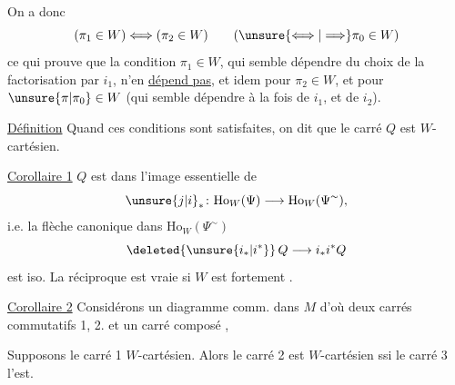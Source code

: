On a donc
\[
(\pi_1\in W)\Longleftrightarrow(\pi_2\in W)\qquad(\unsure{\Longleftrightarrow|\Longrightarrow}\pi_0\in W)
\]
ce qui prouve que la condition $\pi_1\in W$, qui semble dépendre du choix de la factorisation par $i_1$, n'en \uline{dépend pas}, et idem pour $\pi_2\in W$, et pour $\unsure{\pi|\pi_0}\in W$ (qui semble dépendre à la fois de $i_1$, et de $i_2$).

\uline{Définition} Quand ces conditions sont satisfaites, on dit que le carré $Q$ est $W$-cartésien.

\uline{Corollaire 1}    $Q$  est dans l'image essentielle de 
\[
\unsure{j|i}_*\colon\mathrm{Ho}_W(\Psi)\longrightarrow\mathrm{Ho}_W(\Psi^{\sim}),
\]
i.e. la flèche canonique dans $\mathrm{Ho}_W(\Psi^{\sim})$
\[
\deleted{\unsure{i_*|i^*}}\,Q\longrightarrow i_*i^*Q
\]
est iso. La réciproque est vraie si $W$ est fortement .

\uline{Corollaire 2} Considérons un diagramme comm. dans $M$
d'où deux carrés commutatifs 1, 2. et un carré composé ,

Supposons le carré 1 $W$-cartésien. Alors le carré 2 est $W$-cartésien ssi le carré 3 l'est.

